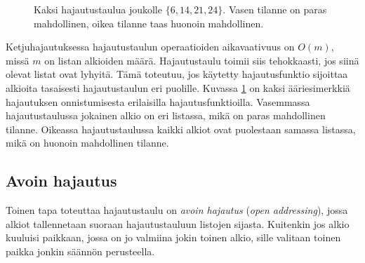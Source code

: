 \begin{figure}
\center
{}
\caption{Kaksi hajautustaulua joukolle $\{6,14,21,24\}$.
Vasen tilanne on paras mahdollinen, oikea tilanne taas
huonoin mahdollinen.}
\label{fig:hajjak}
\end{figure}

Ketjuhajautuksessa
hajautustaulun operaatioiden aikavaativuus on $O(m)$,
missä $m$ on listan alkioiden määrä.
Hajautustaulu toimii siis tehokkaasti, jos
siinä olevat listat ovat lyhyitä.
Tämä toteutuu, jos käytetty hajautusfunktio sijoittaa
alkioita tasaisesti hajautustaulun eri puolille.
Kuvassa \ref{fig:hajjak} on kaksi ääriesimerkkiä
hajautuksen onnistumisesta erilaisilla hajautusfunktioilla.
Vasemmassa hajautustaulussa jokainen alkio on eri listassa,
mikä on paras mahdollinen tilanne.
Oikeassa hajautustaulussa kaikki alkiot ovat puolestaan samassa listassa,
mikä on huonoin mahdollinen tilanne.

\subsection{Avoin hajautus}


Toinen tapa toteuttaa hajautustaulu on \emph{avoin hajautus}
(\emph{open addressing}),
jossa alkiot tallennetaan suoraan hajautustauluun listojen sijasta.
Kuitenkin jos alkio kuuluisi paikkaan, jossa on jo valmiina
jokin toinen alkio, sille valitaan toinen paikka jonkin säännön perusteella.

